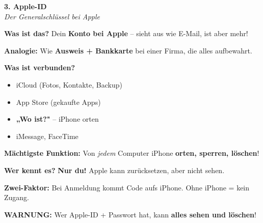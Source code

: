\documentclass[a4paper,landscape,8pt]{extarticle}
\begin{document}
\begin{minipage}[t]{0.32\linewidth}
\begin{center}
\colorbox{applered!10}{%
\begin{minipage}{0.95\linewidth}
\vspace{2mm}
\begin{center}
{\Large\bfseries\textcolor{applered}{3. Apple-ID}}\\[1pt]
{\footnotesize\itshape Der Generalschlüssel bei Apple}
\end{center}
\vspace{2mm}
\end{minipage}%
}
\end{center}

\vspace{1mm}

\textbf{Was ist das?} Dein \textbf{Konto bei Apple} -- sieht aus wie E-Mail, ist aber mehr!

\textbf{Analogie:} Wie \textbf{Ausweis + Bankkarte} bei einer Firma, die alles aufbewahrt.

\textbf{Was ist verbunden?}
\begin{itemize}
\item iCloud (Fotos, Kontakte, Backup)
\item App Store (gekaufte Apps)
\item \textbf{„Wo ist?"} -- iPhone orten
\item iMessage, FaceTime
\end{itemize}

\textbf{Mächtigste Funktion:} Von \textit{jedem} Computer iPhone \textbf{orten, sperren, löschen}!

\textbf{Wer kennt es?} \textbf{Nur du!} Apple kann zurücksetzen, aber nicht sehen.

\textbf{Zwei-Faktor:} Bei Anmeldung kommt Code aufs iPhone. Ohne iPhone = kein Zugang.

\textbf{WARNUNG:} Wer Apple-ID + Passwort hat, kann \textbf{alles sehen und löschen}!

\end{minipage}

\vspace{1mm}

\begin{center}
\end{center}
\end{document}
